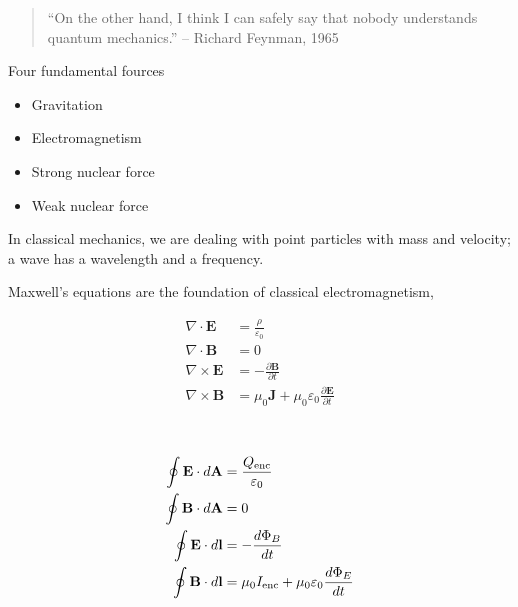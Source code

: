  \label{ch:Introduction}
\begin{quote}
  ``On the other hand, I think I can safely say that nobody understands quantum mechanics.'' -- Richard Feynman, 1965
\end{quote}

Four fundamental fources
\begin{itemize}
    \item \textsf{Gravitation}
    \item \textsf{Electromagnetism}
    \item \textsf{Strong nuclear force} 
    \item \textsf{Weak nuclear force} 
\end{itemize}

In classical mechanics, we are dealing with point particles with mass and velocity; a wave has a wavelength and a frequency. 

\textsf{Maxwell's equations} are the foundation of classical electromagnetism,
\begin{definition}
\begin{equation}
\begin{aligned}
  \nabla \cdot \mathbf{E} &= \frac{\rho}{\varepsilon_0} \\
  \nabla \cdot \mathbf{B} &= 0 \\
  \nabla \times \mathbf{E} &= -\frac{\partial \mathbf{B}}{\partial t} \\
  \nabla \times \mathbf{B} &= \mu_0 \mathbf{J} + \mu_0 \varepsilon_0 \frac{\partial \mathbf{E}}{\partial t}
\end{aligned}
\end{equation}
\vspace{-0.5cm}
\end{definition}\\

\begin{definition}
\begin{equation}
\begin{aligned}
  \oint \mathbf{E} \cdot d\mathbf{A} &= \frac{Q_{\text{enc}}}{\varepsilon_0} \\
  \oint \mathbf{B} \cdot d\mathbf{A} &= 0 \\
  \oint \mathbf{E} \cdot d\mathbf{l} &= -\frac{d\Phi_B}{dt} \\
  \oint \mathbf{B} \cdot d\mathbf{l} &= \mu_0 I_{\text{enc}} + \mu_0 \varepsilon_0 \frac{d\Phi_E}{dt}
\end{aligned}
\vspace{-0.5cm}
\end{equation}
\end{definition}

